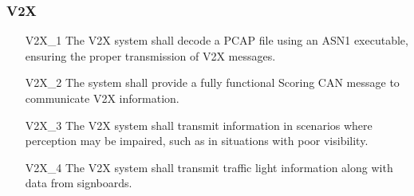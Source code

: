 \subsubsection{V2X}
\begin{itemize}
    \item[V2X\_1] The V2X system shall decode a PCAP file using an ASN1 executable, ensuring the proper transmission of V2X messages.
    \item[V2X\_2] The system shall provide a fully functional Scoring CAN message to communicate V2X information.  
    \item[V2X\_3] The V2X system shall transmit information in scenarios where perception may be impaired, such as in situations with poor visibility.
    \item[V2X\_4] The V2X system shall transmit traffic light information along with data from signboards.
\end{itemize}

